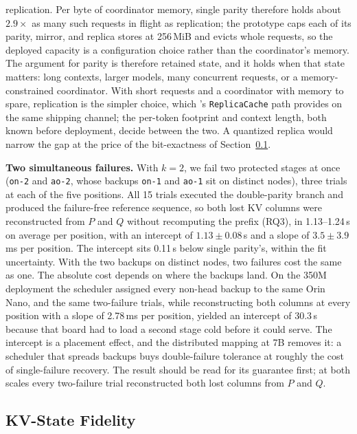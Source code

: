 replication.  Per byte of coordinator memory, single parity therefore holds
about $2.9\times$ as many such requests in flight as replication; the
prototype caps each of its parity, mirror, and replica stores at 256\,MiB and
evicts whole requests, so the deployed capacity is a configuration choice
rather than the coordinator's memory.  The argument for parity is therefore
retained state, and it holds when that state matters: long contexts, larger
models, many concurrent requests, or a memory-constrained coordinator.  With
short requests and a coordinator with memory to spare, replication is the
simpler choice, which \sys{}'s \texttt{ReplicaCache} path provides on the
same shipping channel; the per-token footprint and context length, both
known before deployment, decide between the two.  A quantized replica would
narrow the gap at the price of the bit-exactness of
Section~\ref{sec:eval:fidelity}.

\textbf{Two simultaneous failures.}  With $k=2$, we fail two protected
stages at once (\texttt{on-2} and \texttt{ao-2}, whose backups
\texttt{on-1} and \texttt{ao-1} sit on distinct nodes), three trials at each
of the five positions.  All 15 trials executed the double-parity branch and
produced the failure-free reference sequence, so both lost KV columns were
reconstructed from $P$ and $Q$ without recomputing the prefix (RQ3), in
1.13--1.24\,s on average per position, with an intercept of $1.13\pm0.08$\,s
and a slope of $3.5\pm3.9$\,ms per position.  The intercept sits 0.11\,s
below single parity's, within the fit uncertainty.  With the two backups on
distinct nodes, two failures cost the same as one.  The absolute cost depends on where
the backups land.  On the 350M deployment the scheduler assigned every
non-head backup to the same Orin Nano, and the same two-failure trials, while
reconstructing both columns at every position with a slope of 2.78\,ms per
position, yielded an intercept of 30.3\,s because that board had to load a
second stage cold before it could serve.  The intercept is a placement effect, and the distributed mapping at 7B
removes it: a scheduler that spreads backups buys double-failure tolerance
at roughly the cost of single-failure recovery.  The result should be read
for its guarantee first; at both scales every two-failure trial
reconstructed both lost columns from $P$ and $Q$.

\subsection{KV-State Fidelity}\label{sec:eval:fidelity}

